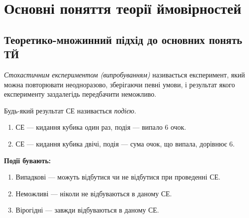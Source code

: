 
\section{Основні поняття теорії ймовірностей}
\subsection{Теоретико-множинний підхід до основних понять ТЙ}
\begin{definition}
    \emph{Стохастичним експериментом (випробуванням)} називається експеримент, 
    який можна повторювати неодноразово, зберігаючи певні умови, і результат якого 
    експерименту заздалегідь передбачити неможливо.
\end{definition}
\begin{definition}
    Будь-який результат СЕ називається \emph{подією}.
\end{definition}
\begin{example}
    \begin{enumerate}
        \item СЕ --- кидання кубика один раз, подія --- випало 6 очок.
        \item СЕ --- кидання кубика двічі, подія --- сума очок, що випала, дорівнює 6.
    \end{enumerate}
\end{example}

\noindent \textbf{Події бувають:}
\begin{enumerate}
    \item Випадкові --- можуть відбутися чи не відбутися при проведенні СЕ.
    \item Неможливі --- ніколи не відбуваються в даному СЕ.
    \item Вірогідні --- завжди відбуваються в даному СЕ.
\end{enumerate}

